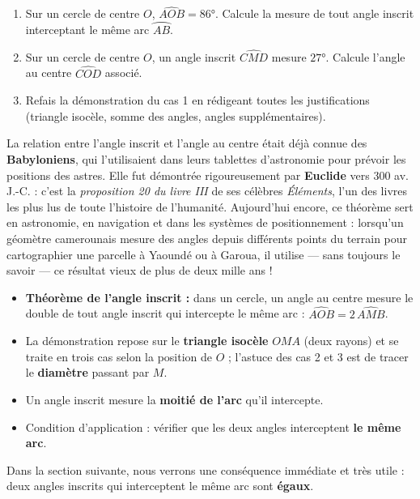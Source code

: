 \documentclass[11pt]{article}
\begin{document}
\begin{exercice}
\begin{enumerate}
\item Sur un cercle de centre $O$, $\widehat{AOB} = 86°$. Calcule la mesure de tout angle inscrit interceptant le même arc $\wideparen{AB}$.
\item Sur un cercle de centre $O$, un angle inscrit $\widehat{CMD}$ mesure $27°$. Calcule l'angle au centre $\widehat{COD}$ associé.
\item Refais la démonstration du cas 1 en rédigeant toutes les justifications (triangle isocèle, somme des angles, angles supplémentaires).
\end{enumerate}
\end{exercice}

\begin{savaistu}
La relation entre l'angle inscrit et l'angle au centre était déjà connue des \textbf{Babyloniens}, qui l'utilisaient dans leurs tablettes d'astronomie pour prévoir les positions des astres. Elle fut démontrée rigoureusement par \textbf{Euclide} vers 300 av. J.-C. : c'est la \emph{proposition 20 du livre III} de ses célèbres \emph{Éléments}, l'un des livres les plus lus de toute l'histoire de l'humanité. Aujourd'hui encore, ce théorème sert en astronomie, en navigation et dans les systèmes de positionnement : lorsqu'un géomètre camerounais mesure des angles depuis différents points du terrain pour cartographier une parcelle à Yaoundé ou à Garoua, il utilise — sans toujours le savoir — ce résultat vieux de plus de deux mille ans !
\end{savaistu}

\begin{aretenir}
\begin{itemize}
\item \textbf{Théorème de l'angle inscrit :} dans un cercle, un angle au centre mesure le double de tout angle inscrit qui intercepte le même arc : $\widehat{AOB} = 2\,\widehat{AMB}$.
\item La démonstration repose sur le \textbf{triangle isocèle} $OMA$ (deux rayons) et se traite en trois cas selon la position de $O$ ; l'astuce des cas 2 et 3 est de tracer le \textbf{diamètre} passant par $M$.
\item Un angle inscrit mesure la \textbf{moitié de l'arc} qu'il intercepte.
\item Condition d'application : vérifier que les deux angles interceptent \textbf{le même arc}.
\end{itemize}
Dans la section suivante, nous verrons une conséquence immédiate et très utile : deux angles inscrits qui interceptent le même arc sont \textbf{égaux}.
\end{aretenir}
\end{document}
